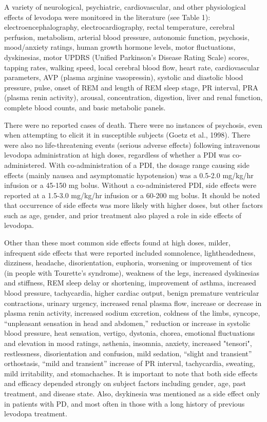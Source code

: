 A variety of neurological, psychiatric, cardiovascular, and other physiological effects of levodopa  were monitored in the literature (see Table 1): electroencephalography, electrocardiography, rectal temperature, cerebral perfusion, metabolism, arterial blood pressure, autonomic function, psychosis, mood/anxiety ratings, human growth hormone levels, motor fluctuations, dyskinesias, motor UPDRS (Unified Parkinson’s Disease Rating Scale) scores, tapping rates, walking speed, local cerebral blood flow, heart rate, cardiovascular parameters, AVP (plasma arginine vasopressin), systolic and diastolic blood pressure, pulse, onset of REM and length of REM sleep stage, PR interval, PRA (plasma renin activity), arousal, concentration, digestion, liver and renal function, complete blood counts, and basic metabolic panels.

There were no reported cases of death.  There were no instances of psychosis, even when attempting to elicit it in susceptible subjects (Goetz et al., 1998).  There were also no life-threatening events (serious adverse effects) following intravenous levodopa administration at high doses, regardless of whether a PDI was co-administered.  With co-administration of a PDI, the dosage range causing side effects (mainly nausea and asymptomatic hypotension) was a 0.5-2.0 mg/kg/hr infusion or a 45-150 mg bolus.  Without a co-administered PDI, side effects were reported at a 1.5-3.0 mg/kg/hr infusion or a 60-200 mg bolus. It should be noted that occurrence of side effects was more likely with higher doses, but other factors such as age, gender, and prior treatment also played a role in side effects of levodopa.  

Other than these most common side effects found at high doses, milder, infrequent side effects that were reported included somnolence, lightheadedness, dizziness, headache, disorientation, euphoria, worsening or improvement of tics (in people with Tourette’s syndrome), weakness of the legs, increased dyskinesias and stiffness, REM sleep delay or shortening, improvement of asthma, increased blood pressure, tachycardia, higher cardiac output, benign premature ventricular contractions, urinary urgency, increased renal plasma flow, increase or decrease in plasma renin activity, increased sodium excretion, coldness of the limbs, syncope, “unpleasant sensation in head and abdomen,” reduction or increase in systolic blood pressure, heat sensation, vertigo, dystonia, chorea, emotional fluctuations and elevation in mood ratings, asthenia, insomnia, anxiety, increased "tensori", restlessness, disorientation and confusion, mild sedation, “slight and transient” orthostasis, “mild and transient” increase of PR interval, tachycardia, sweating, mild irritability, and stomachaches.  It is important to note that both side effects and efficacy depended strongly on subject factors including gender, age, past treatment, and disease state.  Also, dsykinesia was mentioned as a side effect only in patients with PD, and most often in those with a long history of previous levodopa treatment.

